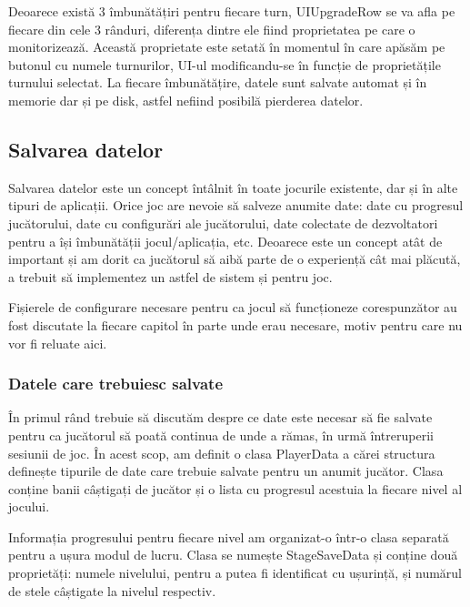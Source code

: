 \documentclass[12pt, a4paper]{article}
\begin{document}
	Deoarece există 3 îmbunătățiri pentru fiecare turn, UIUpgradeRow se va afla pe fiecare din cele 3 rânduri, diferența dintre ele fiind proprietatea pe care o monitorizează. Această proprietate este setată în momentul în care apăsăm pe butonul cu numele turnurilor, UI-ul modificandu-se în funcție de proprietățile turnului selectat. La fiecare îmbunătățire, datele sunt salvate automat și în memorie dar și pe disk, astfel nefiind posibilă pierderea datelor.
	
	
	
	
	
	\subsection{Salvarea datelor}
	
	Salvarea datelor este un concept întâlnit în toate jocurile existente, dar și în alte tipuri de aplicații. Orice joc are nevoie să salveze anumite date: date cu progresul jucătorului, date cu configurări ale jucătorului, date colectate de dezvoltatori pentru a își îmbunătății jocul/aplicația, etc. Deoarece este un concept atât de important și am dorit ca jucătorul să aibă parte de o experiență cât mai plăcută, a trebuit să implementez un astfel de sistem și pentru joc.
	\newline
	
	Fișierele de configurare necesare pentru ca jocul să funcționeze corespunzător au fost discutate la fiecare capitol în parte unde erau necesare, motiv pentru care nu vor fi reluate aici.
	
	
	
	
	
	\subsubsection{Datele care trebuiesc salvate}
	
	În primul rând trebuie să discutăm despre ce date este necesar să fie salvate pentru ca jucătorul să poată continua de unde a rămas, în urmă întreruperii sesiunii de joc. În acest scop, am definit o clasa PlayerData a cărei structura definește tipurile de date care trebuie salvate pentru un anumit jucător. Clasa conține banii câștigați de jucător și o lista cu progresul acestuia la fiecare nivel al jocului. 
	\newline
	
	Informația progresului pentru fiecare nivel am organizat-o într-o clasa separată pentru a ușura modul de lucru. Clasa se numește StageSaveData și conține două proprietăți: numele nivelului, pentru a putea fi identificat cu ușurință, și numărul de stele câștigate la nivelul respectiv.
	\newline
	
\end{document}
